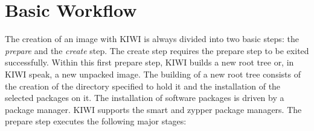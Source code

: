 \chapter{Basic Workflow}
\label{chapter:workflow}
\minitoc

The creation of an image with KIWI is always divided into two
basic steps: the \emph{prepare} and the \emph{create}
step. The create step requires the prepare step to be exited
successfully. Within this first prepare step, KIWI builds a new root
tree or, in KIWI speak, a new unpacked image. The building of a new
root tree consists of the creation of the directory specified to
hold it and the installation of the selected packages on it. The
installation of software packages is driven by a package manager.
KIWI supports the smart
and zypper package managers. The prepare
step executes the following major stages:


